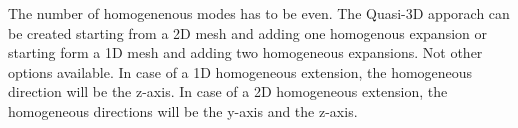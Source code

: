 The number of homogenenous modes has to be even. The Quasi-3D apporach can be
created starting from a 2D mesh and adding one homogenous expansion or starting
form a 1D mesh and adding two homogeneous expansions. Not other options
available. In case of a 1D homogeneous extension, the homogeneous direction will
be the z-axis. In case of a 2D homogeneous extension, the homogeneous directions
will be the y-axis and the z-axis.

